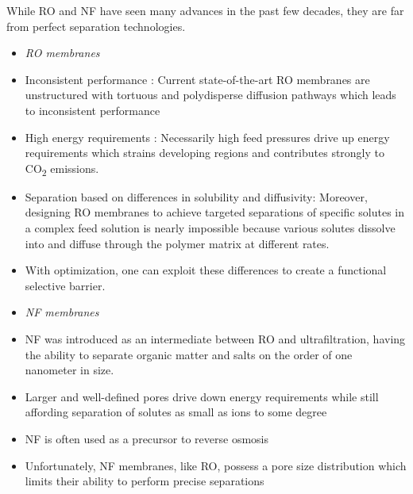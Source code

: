 \documentclass{article}
\begin{document}
  While RO and NF have seen many advances in the past few decades, they 
  are far from perfect separation technologies.
  \begin{itemize}
    \item \textit{RO membranes}
    \item Inconsistent performance : Current state-of-the-art RO membranes are unstructured with
    tortuous and polydisperse diffusion pathways which leads to 
    inconsistent performance \cite{song_nano_2011}
    \item High energy requirements : Necessarily high feed pressures 
    drive up energy requirements which strains developing regions and
    contributes strongly to CO\textsubscript{2} emissions. \cite{mcginnis_global_2008}
    \item Separation based on differences in solubility and diffusivity:
    Moreover, designing RO membranes to achieve targeted separations of 
    specific solutes in a complex feed solution is nearly impossible because various solutes dissolve
    into and diffuse through the polymer matrix at different rates. \cite{wijmans_solution-diffusion_1995}
    \item With optimization, one can exploit these differences to create a functional
    selective barrier.
    \item \textit{NF membranes}
    \item NF was introduced as an intermediate between RO and ultrafiltration,
    having the ability to separate organic matter and salts on the order of 
    one nanometer in size.
    \item Larger and well-defined pores drive down energy requirements while
    still affording separation of solutes as small as ions to some degree \cite{van_der_bruggen_review_2003}
    \item NF is often used as a precursor to reverse osmosis
    \item Unfortunately, NF membranes, like RO, possess a pore size 
    distribution which limits their ability to perform precise separations \cite{bowen_modelling_2002}
  \end{itemize}
  
\end{document}

